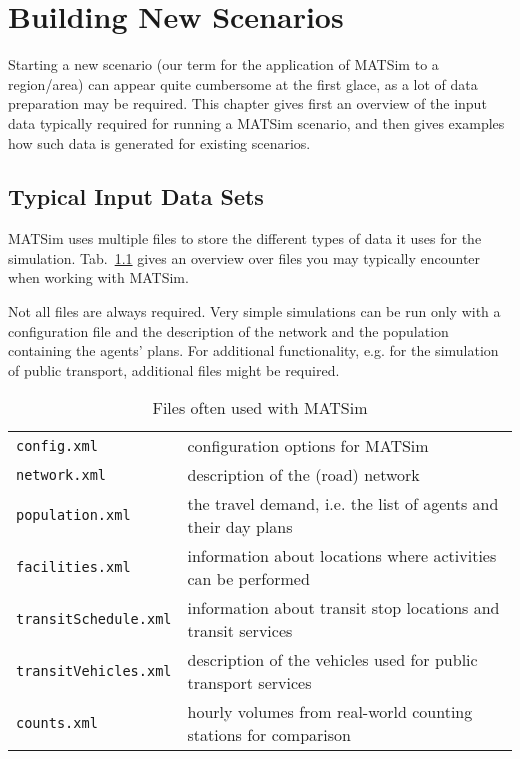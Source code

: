 \chapter{Building New Scenarios}
\label{sec:BuildingScenarios}

 
\bigskip

\begin{chapter-intro}
Starting a new scenario (our term for the application of MATSim to a 
region/area) can appear quite cumbersome at the first glace, as a lot of data
preparation may be required. This chapter gives first an overview of the input
data typically required for running a MATSim scenario, and then gives examples
how such data is generated for existing scenarios.
\end{chapter-intro}

\section{Typical Input Data Sets}
MATSim uses multiple files to store the different types of data it uses for the
simulation. Tab.~\ref{tab:BuildingScenarios:InputDataSets} gives an
overview over files you may typically encounter when working with MATSim.

Not all files are always required. Very simple simulations can be run
only with a configuration file and the description of the network and
the population containing the agents' plans. For additional functionality, e.g.
for the simulation of public transport, additional files might be required.

\begin{table}[htp]
\begin{tabular}{ll}
\hline
{\tt config.xml}          & configuration options for MATSim \\
{\tt network.xml}         & description of the (road) network \\
{\tt population.xml}      & the travel demand, i.e. the list of agents
and their day plans
\\
{\tt facilities.xml}      & information about locations where
activities can be performed\\
{\tt transitSchedule.xml} & information about transit stop locations
and transit services\\
{\tt transitVehicles.xml} & description of the vehicles used for
public transport services\\
{\tt counts.xml}          & hourly volumes from real-world counting
stations for comparison\\
\hline
\end{tabular}
\caption{Files often used with MATSim}
\label{tab:BuildingScenarios:InputDataSets}
\end{table}

